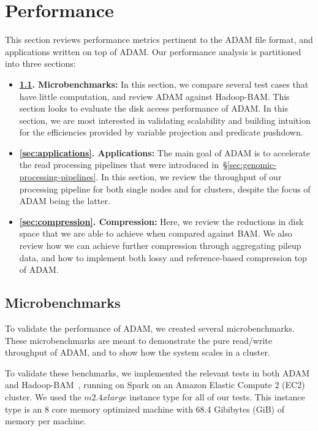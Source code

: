 \documentclass[10pt,twocolumn]{article}
\theoremstyle{plain}
\begin{document}
\section{Performance}
\label{sec:performance}

This section reviews performance metrics pertinent to the ADAM file format, and applications written on top of ADAM. Our performance
analysis is partitioned into three sections:

\begin{itemize}
\item {\bf \ref{sec:microbenchmarks}. Microbenchmarks:} In this section, we compare several test cases that have little computation, and
review ADAM against Hadoop-BAM. This section looks to evaluate the disk access performance of ADAM. In this section, we are most
interested in validating scalability and building intuition for the efficiencies provided by variable projection and predicate pushdown.
\item {\bf \ref{sec:applications}. Applications:} The main goal of ADAM is to accelerate the read processing pipelines that were introduced
in~\S\ref{sec:genomic-processing-pipelines}. In this section, we review the throughput of our processing pipeline for both single nodes and for clusters, despite the focus of ADAM being the latter.
\item {\bf \ref{sec:compression}. Compression:} Here, we review the reductions in disk space that we are able to achieve when compared
against BAM. We also review how we can achieve further compression through aggregating pileup data, and how to implement both
lossy and reference-based compression top of ADAM.
\end{itemize}

\subsection{Microbenchmarks}
\label{sec:microbenchmarks}

To validate the performance of ADAM, we created several microbenchmarks. These microbenchmarks are meant to demonstrate
the pure read/write throughput of ADAM, and to show how the system scales in a cluster. 

To validate these benchmarks, we implemented
the relevant tests in both ADAM and Hadoop-BAM~\cite{niemenmaa12}, running on Spark on an Amazon Elastic Compute 2 (EC2)
cluster. We used the $m2.4xlarge$ instance type for all of our tests. This instance type is an 8 core memory optimized machine
with 68.4 Gibibytes (GiB) of memory per machine. 
\end{document}
